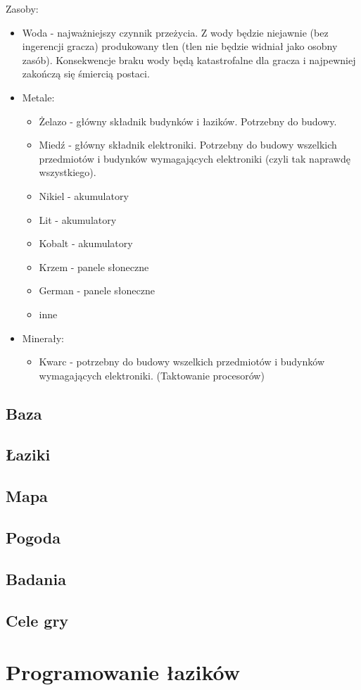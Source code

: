 \documentclass[a4paper,12pt]{article}
\begin{document}
Zasoby:
\begin{itemize}
	\item Woda - najważniejszy czynnik przeżycia. Z wody będzie niejawnie (bez ingerencji gracza) produkowany tlen (tlen nie będzie widniał jako osobny zasób). Konsekwencje braku wody będą katastrofalne dla gracza i najpewniej zakończą się śmiercią postaci.
	\item Metale:
	\begin{itemize}
		\item Żelazo - główny składnik budynków i łazików. Potrzebny do budowy.
		\item Miedź - główny składnik elektroniki. Potrzebny do budowy wszelkich przedmiotów i budynków wymagających elektroniki (czyli tak naprawdę wszystkiego).
		\item Nikiel - akumulatory
		\item Lit - akumulatory
		\item Kobalt - akumulatory
		\item Krzem - panele słoneczne
		\item German - panele słoneczne
		\item inne
	\end{itemize}
	\item Minerały:
	\begin{itemize}
		\item Kwarc - potrzebny do budowy wszelkich przedmiotów i budynków wymagających elektroniki. (Taktowanie procesorów)
	\end{itemize}
\end{itemize}
\subsection{Baza}
\subsection{Łaziki}
\subsection{Mapa}
\subsection{Pogoda}
\subsection{Badania}
\subsection{Cele gry}
\section{Programowanie łazików}
\end{document}
